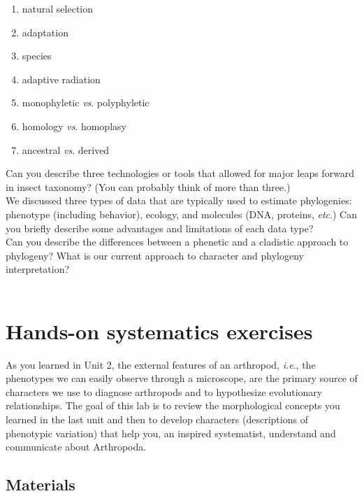 \documentclass[letterpaper, 11pt]{article}
\begin{document}
\begin{enumerate} 
\item{natural selection} 
\item{adaptation}  
\item{species}  
\item {adaptive radiation}
\item {monophyletic \textit{vs}. polyphyletic}  
\item {homology \textit{vs}. homoplasy}  
\item {ancestral \textit{vs}. derived}
\end{enumerate}

\noindent{}Can you describe three technologies or tools that allowed for major leaps forward in insect taxonomy? (You can probably think of more than three.)\\

\noindent{}We discussed three types of data that are typically used to estimate phylogenies: phenotype (including behavior), ecology, and molecules (DNA, proteins, \textit{etc}.) Can you briefly describe some advantages and limitations of each data type?\\

\noindent{}Can you describe the differences between a phenetic and a cladistic approach to phylogeny? What is our current approach to character and phylogeny interpretation? \\

\\

\section{Hands-on systematics exercises}
As you learned in Unit 2, the external features of an arthropod, \textit{i.e}., the phenotypes we can easily observe through a microscope, are the primary source of characters we use to diagnose arthropods and to hypothesize evolutionary relationships. The goal of this lab is to review the morphological concepts you learned in the last unit and then to develop characters (descriptions of phenotypic variation) that help you, an inspired systematist, understand and communicate about Arthropoda.

\subsection*{Materials}
\end{document}

